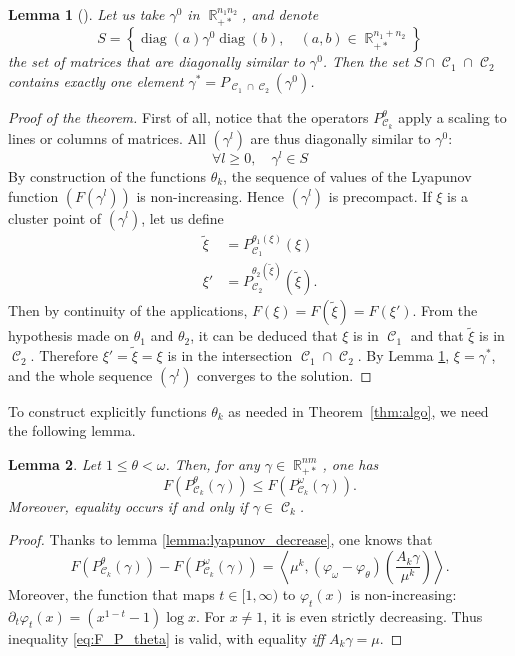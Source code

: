 \documentclass{article} %
\newcommand{\scal}[2]{\left\langle #1 , #2 \right\rangle}
\DeclareMathOperator{\IR}{\mathbb{R}}
\DeclareMathOperator{\Ccal}{\mathcal{C}}
\DeclareMathOperator{\diag}{diag}
\theoremstyle{plain}
\newtheorem{lemma}{Lemma}
\theoremstyle{definition}
\theoremstyle{remark}
\begin{document}
\begin{lemma}[\cite{cuturi13}]
	\label{lemma:trivial_intersection}
	Let us take $\gamma^0$ in $\IR_{+*}^{n_1 n_2}$,
	and denote
	\[
	S = \left\{
	\diag(a) \gamma^0 \diag(b),\quad
	(a,b) \in \IR_{+*}^{n_1 + n_2}
	\right\}
	\]
	the set of matrices that are diagonally similar to $\gamma^0$.
	Then the set $S \cap \Ccal_1 \cap \Ccal_2$ contains exactly one element $\gamma^* = P_{\Ccal_1 \cap \Ccal_2}(\gamma^0)$.
\end{lemma}


\begin{proof}[Proof of the theorem]
	First of all, notice that the operators $P_{\Ccal_k}^\theta$ apply a scaling to lines or columns of matrices. All $(\gamma^l)$ are thus diagonally similar to $\gamma^0$:
	\[
	\forall l\ge0,\quad \gamma^l \in S
	\]
	By construction of the functions $\theta_k$, the sequence of values of the Lyapunov function $(F(\gamma^l))$ is non-increasing. Hence $(\gamma^l)$ is precompact.
	If $\xi$ is a cluster point of $(\gamma^l)$, let us define
	\begin{align*}
	\tilde{\xi} &= P_{\Ccal_1}^{\theta_1(\xi)}(\xi) \\
	\xi' &= P_{\Ccal_2}^{\theta_2(\tilde{\xi})}(\tilde{\xi}).
	\end{align*}
	Then by continuity of the applications, $F(\xi) = F(\tilde{\xi}) = F(\xi')$.
	From the hypothesis made on $\theta_1$ and $\theta_2$, it can be deduced that $\xi$ is in $\Ccal_1$ and that $\tilde{\xi}$ is in $\Ccal_2$. Therefore $\xi' = \tilde{\xi} = \xi$ is in the intersection $\Ccal_1 \cap \Ccal_2$.
	By Lemma \ref{lemma:trivial_intersection}, $\xi = \gamma^*$, and the whole sequence $(\gamma^l)$ converges to the solution.
\end{proof}




To construct explicitly functions $\theta_k$ as needed in Theorem~\ref{thm:algo}, we need the following lemma.
\begin{lemma}\label{lemma:F_P_theta}
	Let $1\le \theta < \omega$. Then, for any $\gamma \in \IR_{+*}^{nm}$, one has
	\begin{equation}\label{eq:F_P_theta}
	F(P^\theta_{\Ccal_k}(\gamma)) \le F(P^\omega_{\Ccal_k}(\gamma)).
	\end{equation}
	Moreover, equality occurs if and only if $\gamma \in \Ccal_k$.
\end{lemma}
\begin{proof}
	Thanks to lemma \ref{lemma:lyapunov_decrease}, one knows that
	\[
	F(P^\theta_{\Ccal_k}(\gamma)) - F(P^\omega_{\Ccal_k}(\gamma))
	= \scal{\mu^k}{(\varphi_\omega - \varphi_\theta) \left( \frac{A_k \gamma}{\mu^k} \right) } .
	\]
	Moreover, the function that maps $t \in [1,\infty)$ to $\varphi_t(x)$ is non-increasing:
	$\partial_t \varphi_t(x) =  (x^{1-t} - 1)\log x.$
	For $x\neq 1$, it is even strictly decreasing.
	Thus inequality \eqref{eq:F_P_theta} is valid, with equality \emph{iff} $A_k \gamma = \mu$.
\end{proof}
\end{document}
